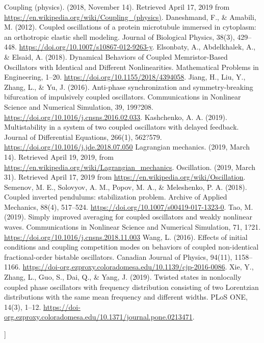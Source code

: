 \documentclass[twocolumn]{article}
\begin{document}
    \begin{@twocolumnfalse}
        \begin{thebibliography}{99}
            Coupling (physics). (2018, November 14). Retrieved April 17, 2019 from \url{https://en.wikipedia.org/wiki/Coupling_(physics)}.
            Daneshmand, F., \& Amabili, M. (2012). Coupled oscillations of a protein microtubule immersed in cytoplasm: an orthotropic elastic shell modeling. Journal of Biological Physics, 38(3), 429–448. \url{https://doi.org/10.1007/s10867-012-9263-y}.
            Elsonbaty, A., Abdelkhalek, A., \& Elsaid, A. (2018). Dynamical Behaviors of Coupled Memristor-Based Oscillators with Identical and Different Nonlinearities. Mathematical Problems in Engineering, 1–20. \url{https://doi.org/10.1155/2018/4394058}.
            Jiang, H., Liu, Y., Zhang, L., \& Yu, J. (2016). Anti-phase synchronization and symmetry-breaking bifurcation of impulsively coupled oscillators. Communications in Nonlinear Science and Numerical Simulation, 39, 199?208. \url{https://doi.org/10.1016/j.cnsns.2016.02.033}.
            Kashchenko, A. A. (2019). Multistability in a system of two coupled oscillators with delayed feedback. Journal of Differential Equations, 266(1), 562?579. \url{https://doi.org/10.1016/j.jde.2018.07.050}
            Lagrangian mechanics. (2019, March 14). Retrieved April 19, 2019, from \url{https://en.wikipedia.org/wiki/Lagrangian_mechanics}.
            Oscillation. (2019, March 31). Retrieved April 17, 2019 from \url{https://en.wikipedia.org/wiki/Oscillation}.
            Semenov, M. E., Solovyov, A. M., Popov, M. A., \& Meleshenko, P. A. (2018). Coupled inverted pendulums: stabilization problem. Archive of Applied Mechanics, 88(4), 517–524. \url{https://doi.org/10.1007/s00419-017-1323-0}.
            Tao, M. (2019). Simply improved averaging for coupled oscillators and weakly nonlinear waves. Communications in Nonlinear Science and Numerical Simulation, 71, 1?21. \url{https://doi.org/10.1016/j.cnsns.2018.11.003}
            Wang, L. (2016). Effects of initial conditions and coupling competition modes on behaviors of coupled non-identical fractional-order bistable oscillators. Canadian Journal of Physics, 94(11), 1158–1166. \url{https://doi-org.ezproxy.coloradomesa.edu/10.1139/cjp-2016-0086}.
            Xie, Y., Zhang, L., Guo, S., Dai, Q., \& Yang, J. (2019). Twisted states in nonlocally coupled phase oscillators with frequency distribution consisting of two Lorentzian distributions with the same mean frequency and different widths. PLoS ONE, 14(3), 1–12. \url{https://doi-org.ezproxy.coloradomesa.edu/10.1371/journal.pone.0213471}.
            \end{thebibliography}
    \end{@twocolumnfalse}
]
\end{document}
